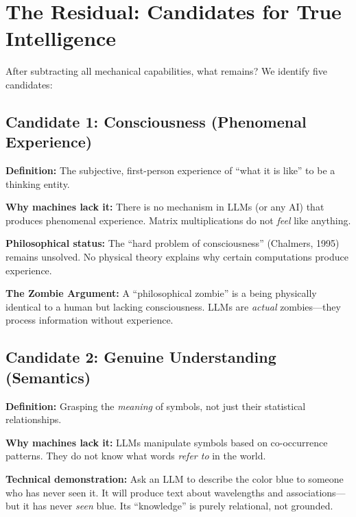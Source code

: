 \section{The Residual: Candidates for True Intelligence}
\label{sec:hi-residual}

After subtracting all mechanical capabilities, what remains? We identify five candidates:

\subsection{Candidate 1: Consciousness (Phenomenal Experience)}

\textbf{Definition:} The subjective, first-person experience of ``what it is like'' to be a thinking entity.

\textbf{Why machines lack it:} There is no mechanism in LLMs (or any AI) that produces phenomenal experience. Matrix multiplications do not \textit{feel} like anything.

\textbf{Philosophical status:} The ``hard problem of consciousness'' (Chalmers, 1995) remains unsolved. No physical theory explains why certain computations produce experience.

\begin{tcolorbox}[colback=yellow!5!white, colframe=yellow!75!black]
\textbf{The Zombie Argument:} A ``philosophical zombie'' is a being physically identical to a human but lacking consciousness. LLMs are \textit{actual} zombies---they process information without experience.
\end{tcolorbox}


\subsection{Candidate 2: Genuine Understanding (Semantics)}

\textbf{Definition:} Grasping the \textit{meaning} of symbols, not just their statistical relationships.

\textbf{Why machines lack it:} LLMs manipulate symbols based on co-occurrence patterns. They do not know what words \textit{refer to} in the world.

\textbf{Technical demonstration:} Ask an LLM to describe the color blue to someone who has never seen it. It will produce text about wavelengths and associations---but it has never \textit{seen} blue. Its ``knowledge'' is purely relational, not grounded.

